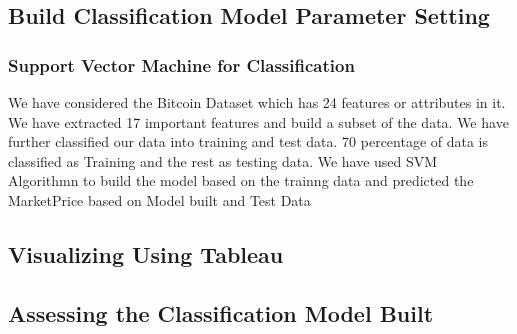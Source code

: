 \documentclass{article}
\begin{document}
\subsection {Build Classification Model Parameter Setting}

\subsubsection {Support Vector Machine for Classification}

We have considered the Bitcoin Dataset which has 24 features or attributes in it. We have extracted 17 important features and build a subset of the data. We have further classified our data into training and test data. 70 percentage of data is classified as Training and the rest as testing data. We have used SVM Algorithmn to build the model based on the trainng data and predicted the Market\textunderscore Price based on Model built and Test Data

\subsection {Visualizing Using Tableau}

\subsection {Assessing the  Classification Model Built}
\end{document}
